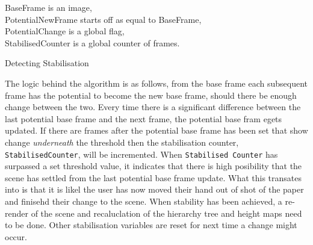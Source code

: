 \documentclass[11pt]{article}
\begin{document}
\begin{algorithm}
\DontPrintSemicolon
BaseFrame is an image,\\
PotentialNewFrame starts off as equal to BaseFrame,\\
PotentialChange is a global flag,\\
StabilisedCounter is a global counter of frames.

\caption{Detecting Stabilisation}
\label{algo:stabilisation}
\end{algorithm}

The logic behind the algorithm is as follows, from the base frame
each subsequent frame has the potential to become the new base frame, should
there be enough change between the two. Every time there is a significant 
difference between the last potential base frame and the next frame, the
potential base fram egets updated. If there are frames after the potential
base frame has been set that show change \textit{underneath} the threshold
then the stabilisation counter, \texttt{StabilisedCounter}, will be 
incremented. When \texttt{Stabilised Counter} has surpassed a set threshold
value, it indicates that there is high posibility that the scene has
settled from the last potential base frame update. What this transates
into is that it is likel the user has now moved their hand out of shot of the
paper and finisehd their change to the scene. When stability has been
achieved, a re-render of the scene and recaluclation of the hierarchy tree 
and height maps need to be done. Other stabilisation variables are reset for
next time a change might occur.
\end{document}
